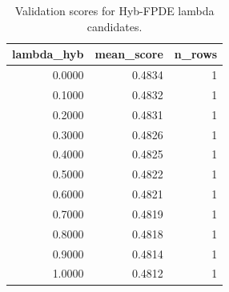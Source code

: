 \begin{table}[t]
\caption{Validation scores for Hyb-FPDE lambda candidates.}
\label{tab:lambda_distribution_computed}
\centering
\begin{tabular}{rrr}
\toprule
lambda\_hyb & mean\_score & n\_rows \\
\midrule
0.0000 & 0.4834 & 1 \\
0.1000 & 0.4832 & 1 \\
0.2000 & 0.4831 & 1 \\
0.3000 & 0.4826 & 1 \\
0.4000 & 0.4825 & 1 \\
0.5000 & 0.4822 & 1 \\
0.6000 & 0.4821 & 1 \\
0.7000 & 0.4819 & 1 \\
0.8000 & 0.4818 & 1 \\
0.9000 & 0.4814 & 1 \\
1.0000 & 0.4812 & 1 \\
\bottomrule
\end{tabular}

\end{table}
